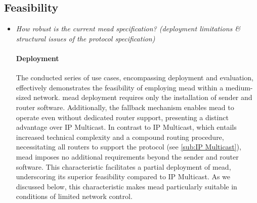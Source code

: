 \subsection{Feasibility} %
\label{sub:discussion_Feasibility}
\begin{itemize}
\item[\textit{\rqi{}}]
    \textit{How robust is the current \gls{mead} specification? (deployment
        limitations \& structural issues of the protocol specification)}\par
    \paragraph{Deployment}
    The conducted series of use cases, encompassing deployment and evaluation,
        effectively demonstrates the feasibility of employing \gls{mead} within a
        medium-sized network.
    \gls{mead} deployment requires only the installation of sender and router
        software.
        Additionally, the fallback mechanism enables \gls{mead} to operate even
        without dedicated router support, presenting a distinct advantage over
        IP Multicast.
    In contrast to IP Multicast, which entails increased technical complexity
        and a compound routing procedure, necessitating all routers to support
        the protocol (see \autoref{sub:IP Multicast}), \gls{mead} imposes no
        additional requirements beyond the sender and router software.
    This characteristic facilitates a partial deployment of \gls{mead},
        underscoring its superior feasibility compared to IP Multicast.
    As we discussed below, this characteristic makes \gls{mead}
        particularly suitable in conditions of limited network control.


\end{itemize}
